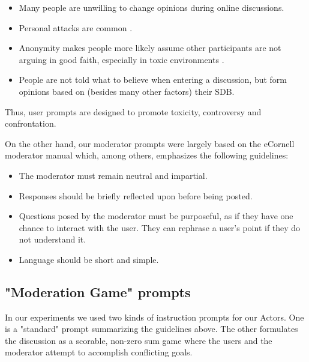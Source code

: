 \begin{itemize}
	\item Many people are unwilling to change opinions during online discussions.
	
	\item Personal attacks are common \cite{dekock2022disagree}.
	
	\item Anonymity makes people more likely assume other participants are not arguing in good faith, especially in toxic environments \cite{Avalle2024PersistentIP}.
	
	\item People are not told what to believe when entering a discussion, but form opinions based on (besides many other factors) their SDB.  %
	
\end{itemize}

Thus, user prompts are designed to promote toxicity, controversy and confrontation.

On the other hand, our moderator prompts were largely based on the eCornell moderator manual \cite{Cornell_eRulemaking2017} which, among others, emphasizes the following guidelines:

\begin{itemize}
	\item The moderator must remain neutral and impartial. 
	
	\item Responses should be briefly reflected upon before being posted.
	
	\item Questions posed by the moderator must be purposeful, as if they have one chance to interact with the user. They can rephrase a user's point if they do not understand it.
	
	\item Language should be short and simple.
\end{itemize}


\subsection{"Moderation Game" prompts}
\label{ssec:system:game-prompt}

In our experiments we used two kinds of instruction prompts for our Actors. One is a "standard" prompt summarizing the guidelines above. The other formulates the discussion as a scorable, non-zero sum game where the users and the moderator attempt to accomplish conflicting goals.


